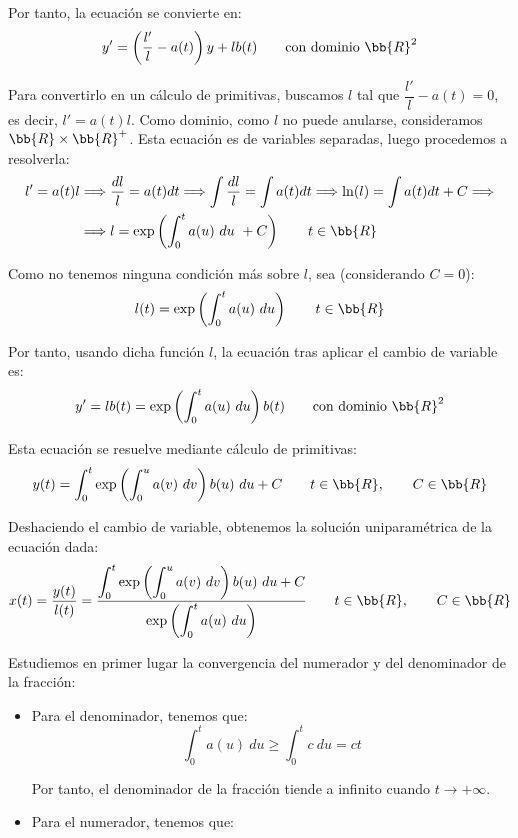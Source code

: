 \begin{ejercicio}
    Por tanto, la ecuación se convierte en:
    \begin{equation*}
        y' = \left(\dfrac{l'}{l} -a(t)\right)y + lb(t)\qquad \text{con dominio }\bb{R}^2
    \end{equation*}

    Para convertirlo en un cálculo de primitivas, buscamos $l$ tal que $\dfrac{l'}{l} -a(t) = 0$, es decir, $l' = a(t)l$. Como dominio, como $l$ no puede anularse, consideramos $\bb{R}\times \bb{R}^+$.
    Esta ecuación es de variables separadas, luego procedemos a resolverla:
    \begin{align*}
        l'=a(t)l &\Longrightarrow \dfrac{dl}{l} = a(t)dt \Longrightarrow \int \dfrac{dl}{l} = \int a(t)dt \Longrightarrow \ln(l) = \int a(t)dt + C \Longrightarrow\\&\Longrightarrow l =  \exp\left(\int_0^t a(u)~du~+C\right)  \qquad t\in \bb{R}
    \end{align*}

    Como no tenemos ninguna condición más sobre $l$, sea (considerando $C=0$):
    \begin{equation*}
        l(t) =  \exp\left(\int_0^t a(u)~du\right)  \qquad t\in \bb{R}
    \end{equation*}

    Por tanto, usando dicha función $l$, la ecuación tras aplicar el cambio de variable es:
    \begin{equation*}
        y' = lb(t) = \exp\left(\int_0^t a(u)~du\right)b(t) \qquad \text{con dominio }\bb{R}^2
    \end{equation*}

    Esta ecuación se resuelve mediante cálculo de primitivas:
    \begin{equation*}
        y(t) = \int_0^t \exp\left(\int_0^u a(v)~dv\right)b(u)~du + C \qquad t\in \bb{R}, \qquad C\in \bb{R}
    \end{equation*}

    Deshaciendo el cambio de variable, obtenemos la solución uniparamétrica de la ecuación dada:
    \begin{equation*}
        x(t) = \dfrac{y(t)}{l(t)} = \dfrac{\displaystyle\int_0^t \exp\left(\int_0^u a(v)~dv\right)b(u)~du + C}{\displaystyle \exp\left(\int_0^t a(u)~du\right)} \qquad t\in \bb{R}, \qquad C\in \bb{R}
    \end{equation*}

    Estudiemos en primer lugar la convergencia del numerador y del denominador de la fracción:
    \begin{itemize}
        \item Para el denominador, tenemos que:
        \begin{equation*}
            \int_0^t a(u)~du \geq \int_0^t c~du = ct
        \end{equation*}

        Por tanto, el denominador de la fracción tiende a infinito cuando $t\to +\infty$.

        
        \item Para el numerador, tenemos que:
    \end{itemize}
\end{ejercicio}

